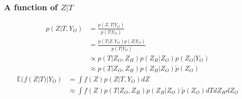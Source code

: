 \documentclass[11pt,a4paper]{article}
\newcommand{\Esp}{\mathds{E}}
\begin{document}
\subsubsection{A function of $Z|T$}
\begin{align*}
 p(Z|T,Y_O) &= \frac{p(Z,T|Y_O)}{p(T|Y_O)}\\
 &= \frac{p(T|Z,Y_O) p(Z|Y_O)}{p(T|Y_O)}\\
 & \propto p(T|Z_O,Z_H) p(Z_H|Z_O) p(Z_O|Y_O)\\
 &\approx  p(T|Z_O,Z_H) p(Z_H|Z_O)  \tilde{p}(Z_O) 
\end{align*}
\begin{align*}
\Esp(f(Z|T)|Y_O) &=\int f(Z) p(Z|T,Y_O) dZ\\
&\approx \int f(Z) p(T|Z_O,Z_H)p(Z_H|Z_O)\tilde{p}(Z_O) dT dZ_H dZ_O
\end{align*}
\end{document}
